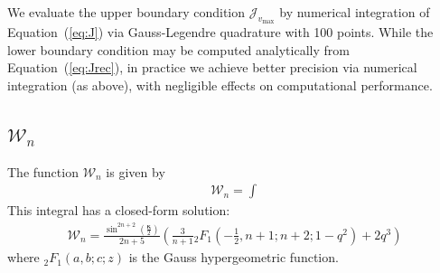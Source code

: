 \documentclass[modern]{aastex62}
\newcommand{\STARRYQUADPOINTS}{100\xspace}
\newcommand{\bkappa}{\boldsymbol{\kappa}}
\newcommand{\vmax}{{v_\mathrm{max}}}
\begin{document}
We evaluate the upper boundary condition $\mathcal{J}_{\vmax}$ by numerical
integration of Equation~(\ref{eq:J}) via Gauss-Legendre quadrature with
\STARRYQUADPOINTS points. While the lower boundary condition may be computed
analytically from Equation~(\ref{eq:Jrec}),
in practice we achieve better precision via numerical
integration (as above), with negligible effects on computational performance.

\subsection{$\mathcal{W}_n$}
%
The function $\mathcal{W}_n$ is given by
%
\begin{align}
    \label{eq:W}
    \mathcal{W}_n = \int
\end{align}
%
This integral has a closed-form solution:
%
\begin{align}
    \label{eq:Wsol}
    \mathcal{W}_n =
    \frac{\sin^{2n + 2}\left(\frac{\bkappa}{2}\right)}{2n + 5}
    \left(
    \frac{3}{n+1}
        {_2F_1}\left(-\frac{1}{2}, n + 1; n + 2; 1 - q^2\right) + 2 q^3
    \right)
\end{align}
%
where ${_2F_1}(a, b; c; z)$ is the Gauss hypergeometric function.




\end{document}
